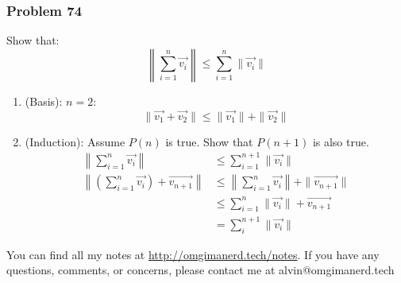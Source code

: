 \documentclass[letterpaper, 12pt]{math}
\begin{document}
\subsubsection*{Problem 74}
Show that:
\[ \left\|\sum_{i=1}^{n}\vec{v_i}\right\| \le \sum_{i=1}^{n}\|\vec{v_i}\| \]
\begin{enumerate}
  \item (Basis): \( n = 2 \):
    \[ \|\vec{v_1}+\vec{v_2}\| \le \|\vec{v_1}\|+\|\vec{v_2}\| \]
  \item (Induction): Assume \( P(n) \) is true. Show that \( P(n+1) \) is also
    true.
    \begin{align*}
      \left\|\sum_{i=1}^{n}\vec{v_i}\right\| &\le
        \sum_{i=1}^{n+1}\|\vec{v_i}\| \\
      \left\|(\sum_{i=1}^{n}\vec{v_i})+\vec{v_{n+1}}\right\|
      &\le \left\|\sum_{i=1}^{n}\vec{v_i}\right\|+\|\vec{v_{n+1}}\| \\
      &\le \sum_{i=1}^{n}\|\vec{v_{i}}\|+\vec{v_{n+1}} \\
      &= \sum_{i}^{n+1}\|\vec{v_i}\|
    \end{align*}
\end{enumerate}

\begin{center}
  You can find all my notes at \url{http://omgimanerd.tech/notes}. If you have
  any questions, comments, or concerns, please contact me at
  alvin@omgimanerd.tech
\end{center}
\end{document}
